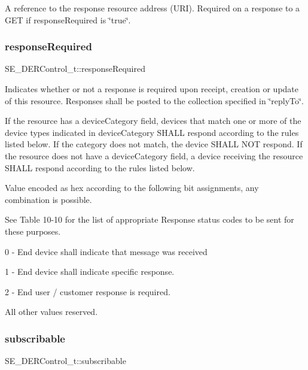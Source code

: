 A reference to the response resource address (U\+RI). Required on a response to a G\+ET if response\+Required is \char`\"{}true\char`\"{}. \mbox{\label{group__DERControl_gaf2999637e9a94c1c27d0db7a93e44f2c}} 
\subsubsection{\texorpdfstring{response\+Required}{responseRequired}}
{\footnotesize\ttfamily S\+E\+\_\+\+D\+E\+R\+Control\+\_\+t\+::response\+Required}

Indicates whether or not a response is required upon receipt, creation or update of this resource. Responses shall be posted to the collection specified in \char`\"{}reply\+To\char`\"{}.

If the resource has a device\+Category field, devices that match one or more of the device types indicated in device\+Category S\+H\+A\+LL respond according to the rules listed below. If the category does not match, the device S\+H\+A\+LL N\+OT respond. If the resource does not have a device\+Category field, a device receiving the resource S\+H\+A\+LL respond according to the rules listed below.

Value encoded as hex according to the following bit assignments, any combination is possible.

See Table 10-\/10 for the list of appropriate Response status codes to be sent for these purposes.

0 -\/ End device shall indicate that message was received

1 -\/ End device shall indicate specific response.

2 -\/ End user / customer response is required.

All other values reserved. \mbox{\label{group__DERControl_ga5ad57e29338dc1d42895e53cbf04262b}} 
\subsubsection{\texorpdfstring{subscribable}{subscribable}}
{\footnotesize\ttfamily S\+E\+\_\+\+D\+E\+R\+Control\+\_\+t\+::subscribable}

